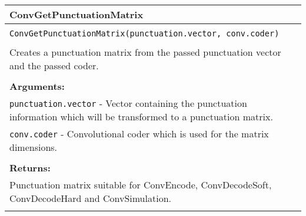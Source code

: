 \begin{longtable}{|p{\textwidth}|}
\hline
\rowcolor{lightblue}ConvGetPunctuationMatrix\\
\hline
\\
\texttt{ConvGetPunctuationMatrix(punctuation.vector, conv.coder)}\\
\\
Creates a punctuation matrix from the passed punctuation vector and the passed coder.\\
\\
\textbf{Arguments:}\\
\texttt{punctuation.vector} - Vector containing the punctuation information which will be transformed to a punctuation matrix.\\
\texttt{conv.coder} - Convolutional coder which is used for the matrix dimensions.\\
\\
\textbf{Returns:}\\
Punctuation matrix suitable for ConvEncode, ConvDecodeSoft, ConvDecodeHard and ConvSimulation.\\
\\
\hline
\end{longtable}